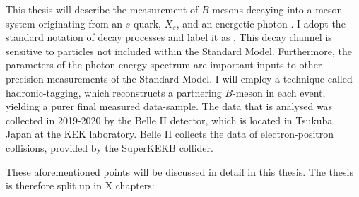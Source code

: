 This thesis will describe the measurement of $B$ mesons decaying into a meson system originating from an $s$ quark, $X_s$, and an energetic photon \g.
I adopt the standard notation of decay processes and label it as \BtoXsgamma.
This decay channel is sensitive to particles not included within the Standard Model. 
Furthermore, the parameters of the photon energy spectrum are important inputs to other precision measurements of the Standard Model.
I will employ a technique called hadronic-tagging, which reconstructs a partnering $B$-meson in each event, yielding a purer final measured data-sample.
The data that is analysed was collected in 2019-2020 by the Belle II detector, which is located in Tsukuba, Japan at the KEK laboratory.
Belle II collects the data of electron-positron collisions, provided by the SuperKEKB collider.

These aforementioned points will be discussed in detail in this thesis.
The thesis is therefore split up in X chapters:

